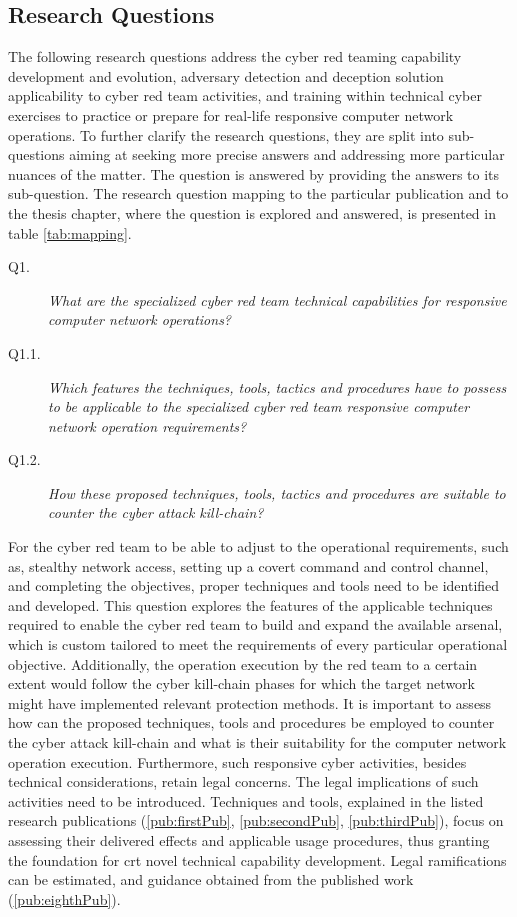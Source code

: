 \subsection{Research Questions}
\label{sec:question}
\glsresetall
The following research questions address the cyber red teaming capability development and evolution, adversary detection and deception solution applicability to cyber red team activities, and training within technical cyber exercises to practice or prepare for real-life responsive computer network operations. To further clarify the research questions, they are split into sub-questions aiming at seeking more precise answers and addressing more particular nuances of the matter. The question is answered by providing the answers to its sub-question.
The research question mapping to the particular publication and to the thesis chapter, where the question is explored and answered, is presented in table \ref{tab:mapping}.

\begin{description}
    \item [Q1.] \emph{What are the specialized cyber red team technical capabilities for responsive computer network operations?}
    \item [Q1.1.] \emph{Which features the techniques, tools, tactics and procedures have to possess to be applicable to the specialized cyber red team responsive computer network operation requirements?}
    \item [Q1.2.] \emph{How these proposed techniques, tools, tactics and procedures are suitable to counter the cyber attack kill-chain?}
\end{description}
For the cyber red team to be able to adjust to the operational requirements, such as, stealthy network access, setting up a covert command and control channel, and completing the objectives, proper techniques and tools need to be identified and developed. This question explores the features of the applicable techniques required to enable the cyber red team to build and expand the available arsenal, which is custom tailored to meet the requirements of every particular operational objective.
Additionally, the operation execution by the red team to a certain extent would follow the cyber kill-chain \cite{LockheedMartin2015} phases for which the target network might have implemented relevant protection methods. It is important to assess how can the proposed techniques, tools and procedures be employed to counter the cyber attack kill-chain and what is their suitability for the computer network operation execution.
Furthermore, such responsive cyber activities, besides technical considerations, retain legal concerns. The legal implications of such activities need to be introduced.
Techniques and tools, explained in the listed research publications (\ref{pub:firstPub}, \ref{pub:secondPub}, \ref{pub:thirdPub}), focus on assessing their delivered effects and applicable usage procedures, thus granting the foundation for \gls{crt} novel technical capability development.
Legal ramifications can be estimated, and guidance obtained from the published work (\ref{pub:eighthPub}).

